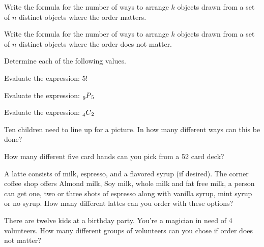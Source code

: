 \begin{problem}

  \item Write the formula for the number of ways to arrange $k$
    objects drawn from a set of $n$ distinct objects where the order
    matters.

    \vfill

  \item Write the formula for the number of ways to arrange $k$
    objects drawn from a set of $n$ distinct objects where the order
    does not matter. 

    \vfill

  \item Determine each of the following values.

    \begin{subproblem}

    \item Evaluate the expression: 5!

      \vfill

    \item Evaluate the expression: $\prescript{~}{9}{P}_5$

      \vfill


    \clearpage

    \item Evaluate the expression: $\prescript{~}{4}{C}_2$

      \vfill

    \item Ten children need to line up for a picture. In how many
      different ways can this be done?

      \vfill

    \item How many different five card hands can you pick from a 52
      card deck?

      \vfill

    \item A latte consists of milk, espresso, and a flavored syrup (if
      desired). The corner coffee shop offers Almond milk, Soy milk,
      whole milk and fat free milk, a person can get one, two or three
      shots of espresso along with vanilla syrup, mint syrup or no
      syrup. How many different lattes can you order with these
      options?

      \vfill

    \item There are twelve kids at a birthday party. You're a magician
      in need of 4 volunteers. How many different groups of volunteers
      can you chose if order does not matter?


\end{subproblem}
\end{problem}
